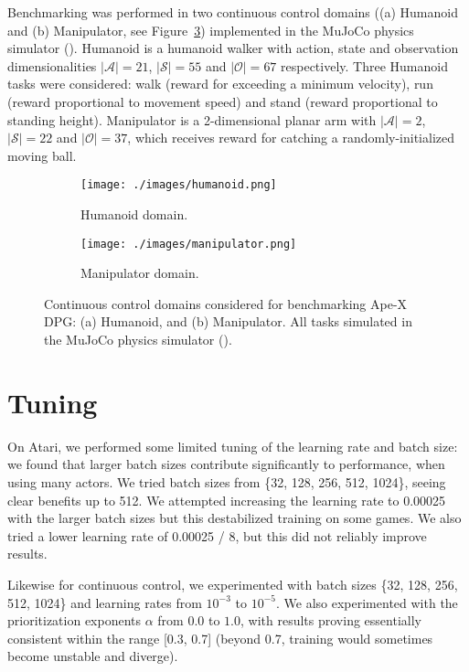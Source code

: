\documentclass{article} \PassOptionsToPackage{usenames,dvipsnames}{xcolor}
\def\apex{Ape-X}
\begin{document}
Benchmarking was performed in two continuous control domains ((a) Humanoid and (b) Manipulator, see Figure~\ref{fig:suite_tasks}) implemented in the MuJoCo physics simulator (\cite{todorov2012mujoco}). Humanoid is a humanoid walker with action, state and observation dimensionalities $|\mathcal{A}|=21$, $|\mathcal{S}|=55$ and $|\mathcal{O}|=67$ respectively. Three Humanoid tasks were considered: walk (reward for exceeding a minimum velocity), run (reward proportional to movement speed) and stand (reward proportional to standing height). Manipulator is a 2-dimensional planar arm with $|\mathcal{A}|=2$, $|\mathcal{S}|=22$ and $|\mathcal{O}|=37$, which receives reward for catching a randomly-initialized moving ball.

\begin{figure}[h!]
\centering
\begin{subfigure}{.5\textwidth}
  \centering
  \texttt{[image: ./images/humanoid.png]}
  \caption{Humanoid domain.}
  \label{fig:sub1}
\end{subfigure}\begin{subfigure}{.5\textwidth}
  \centering
  \texttt{[image: ./images/manipulator.png]}
  \caption{Manipulator domain.}
  \label{fig:sub2}
\end{subfigure}
\caption{Continuous control domains considered for benchmarking {\apex} DPG: (a) Humanoid, and (b) Manipulator. All tasks simulated in the MuJoCo physics simulator (\cite{todorov2012mujoco}).}
\label{fig:suite_tasks}
\end{figure}


\section{Tuning}
On Atari, we performed some limited tuning of the learning rate and batch size: we found that larger batch sizes contribute significantly to performance, when using many actors. We tried batch sizes from \{32, 128, 256, 512, 1024\}, seeing clear benefits up to 512. We attempted increasing the learning rate to 0.00025 with the larger batch sizes but this destabilized training on some games. We also tried a lower learning rate of 0.00025 / 8, but this did not reliably improve results.

Likewise for continuous control, we experimented with batch sizes \{32, 128, 256, 512, 1024\} and learning rates from $10^{-3}$ to $10^{-5}$. We also experimented with the prioritization exponents $\alpha$ from $0.0$ to $1.0$, with results proving essentially consistent within the range [0.3, 0.7] (beyond 0.7, training would sometimes become unstable and diverge).
\end{document}
